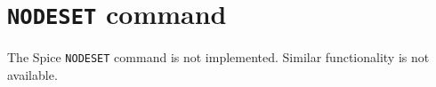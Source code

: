 %
%
%
%
\section{{\tt NODESET} command}
The Spice {\tt NODESET} command is not implemented.  Similar
functionality is not available.
